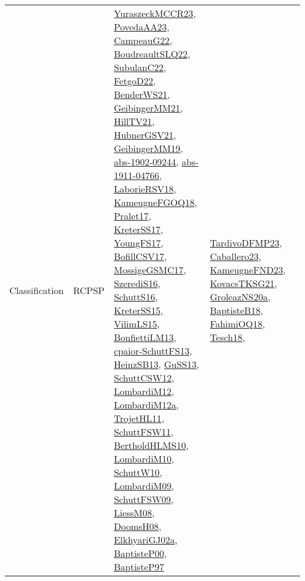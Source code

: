 {\begin{longtable}{lp{3cm}>{\raggedright}p{6cm}>{\raggedright}p{6cm}p{8cm}}
Classification & RCPSP & \href{articles/YuraszeckMCCR23.pdf}{YuraszeckMCCR23}\cite{YuraszeckMCCR23}, \href{papers/PovedaAA23.pdf}{PovedaAA23}\cite{PovedaAA23}, \href{articles/CampeauG22.pdf}{CampeauG22}\cite{CampeauG22}, \href{papers/BoudreaultSLQ22.pdf}{BoudreaultSLQ22}\cite{BoudreaultSLQ22}, \href{articles/SubulanC22.pdf}{SubulanC22}\cite{SubulanC22}, \href{articles/FetgoD22.pdf}{FetgoD22}\cite{FetgoD22}, \href{papers/BenderWS21.pdf}{BenderWS21}\cite{BenderWS21}, \href{papers/GeibingerMM21.pdf}{GeibingerMM21}\cite{GeibingerMM21}, \href{papers/HillTV21.pdf}{HillTV21}\cite{HillTV21}, \href{articles/HubnerGSV21.pdf}{HubnerGSV21}\cite{HubnerGSV21}, \href{papers/GeibingerMM19.pdf}{GeibingerMM19}\cite{GeibingerMM19}, \href{articles/abs-1902-09244.pdf}{abs-1902-09244}\cite{abs-1902-09244}, \href{articles/abs-1911-04766.pdf}{abs-1911-04766}\cite{abs-1911-04766}, \href{articles/LaborieRSV18.pdf}{LaborieRSV18}\cite{LaborieRSV18}, \href{papers/KameugneFGOQ18.pdf}{KameugneFGOQ18}\cite{KameugneFGOQ18}, \href{papers/Pralet17.pdf}{Pralet17}\cite{Pralet17}, \href{articles/KreterSS17.pdf}{KreterSS17}\cite{KreterSS17}, \href{papers/YoungFS17.pdf}{YoungFS17}\cite{YoungFS17}, \href{papers/BofillCSV17.pdf}{BofillCSV17}\cite{BofillCSV17}, \href{papers/MossigeGSMC17.pdf}{MossigeGSMC17}\cite{MossigeGSMC17}, \href{papers/SzerediS16.pdf}{SzerediS16}\cite{SzerediS16}, \href{papers/SchuttS16.pdf}{SchuttS16}\cite{SchuttS16}, \href{papers/KreterSS15.pdf}{KreterSS15}\cite{KreterSS15}, \href{papers/VilimLS15.pdf}{VilimLS15}\cite{VilimLS15}, \href{papers/BonfiettiLM13.pdf}{BonfiettiLM13}\cite{BonfiettiLM13}, \href{papers/cpaior-SchuttFS13.pdf}{cpaior-SchuttFS13}\cite{cpaior-SchuttFS13}, \href{articles/HeinzSB13.pdf}{HeinzSB13}\cite{HeinzSB13}, \href{papers/GuSS13.pdf}{GuSS13}\cite{GuSS13}, \href{papers/SchuttCSW12.pdf}{SchuttCSW12}\cite{SchuttCSW12}, \href{articles/LombardiM12.pdf}{LombardiM12}\cite{LombardiM12}, \href{articles/LombardiM12a.pdf}{LombardiM12a}\cite{LombardiM12a}, \href{articles/TrojetHL11.pdf}{TrojetHL11}\cite{TrojetHL11}, \href{articles/SchuttFSW11.pdf}{SchuttFSW11}\cite{SchuttFSW11}, \href{papers/BertholdHLMS10.pdf}{BertholdHLMS10}\cite{BertholdHLMS10}, \href{papers/LombardiM10.pdf}{LombardiM10}\cite{LombardiM10}, \href{papers/SchuttW10.pdf}{SchuttW10}\cite{SchuttW10}, \href{papers/LombardiM09.pdf}{LombardiM09}\cite{LombardiM09}, \href{papers/SchuttFSW09.pdf}{SchuttFSW09}\cite{SchuttFSW09}, \href{articles/LiessM08.pdf}{LiessM08}\cite{LiessM08}, \href{papers/DoomsH08.pdf}{DoomsH08}\cite{DoomsH08}, \href{papers/ElkhyariGJ02a.pdf}{ElkhyariGJ02a}\cite{ElkhyariGJ02a}, \href{articles/BaptisteP00.pdf}{BaptisteP00}\cite{BaptisteP00}, \href{papers/BaptisteP97.pdf}{BaptisteP97}\cite{BaptisteP97} & \href{papers/TardivoDFMP23.pdf}{TardivoDFMP23}\cite{TardivoDFMP23}, \href{articles/Caballero23.pdf}{Caballero23}\cite{Caballero23}, \href{papers/KameugneFND23.pdf}{KameugneFND23}\cite{KameugneFND23}, \href{papers/KovacsTKSG21.pdf}{KovacsTKSG21}\cite{KovacsTKSG21}, \href{papers/GroleazNS20a.pdf}{GroleazNS20a}\cite{GroleazNS20a}, \href{articles/BaptisteB18.pdf}{BaptisteB18}\cite{BaptisteB18}, \href{articles/FahimiOQ18.pdf}{FahimiOQ18}\cite{FahimiOQ18}, \href{papers/Tesch18.pdf}{Tesch18}\cite{Tesch18}, 
\end{longtable}}
